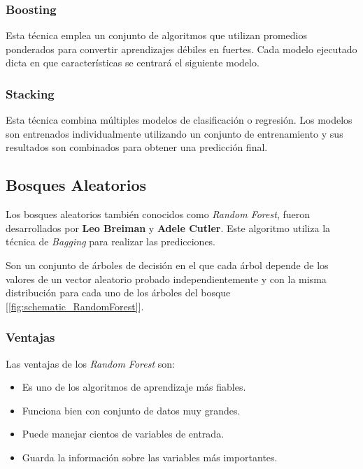 \subsubsection{Boosting}
Esta técnica emplea un conjunto de algoritmos que utilizan promedios ponderados para convertir aprendizajes débiles en fuertes. Cada modelo ejecutado dicta en que características se centrará el siguiente modelo.



\subsubsection{Stacking}
Esta técnica combina múltiples modelos de clasificación o regresión. Los modelos son entrenados individualmente utilizando un conjunto de entrenamiento y sus resultados son combinados para obtener una predicción final.

\subsection[Bosques Aleatorios]{Bosques Aleatorios~\cite{Breiman2001}}
\label{sec:random_forest}
Los bosques aleatorios también conocidos como \textit{Random Forest}, fueron desarrollados por \textbf{Leo Breiman} y \textbf{Adele Cutler}. Este algoritmo utiliza la técnica de \textit{Bagging} para realizar las predicciones.

Son un conjunto de árboles de decisión en el que cada árbol depende de los valores de un vector aleatorio probado independientemente y con la misma distribución para cada uno de los árboles del bosque [\cref{fig:schematic_RandomForest}].


\subsubsection{Ventajas}

Las ventajas de los \textit{Random Forest} son:

\begin{itemize}
    \item Es uno de los algoritmos de aprendizaje más fiables.
    \item Funciona bien con conjunto de datos muy grandes.
    \item Puede manejar cientos de variables de entrada.
    \item Guarda la información sobre las variables más importantes.
\end{itemize}

